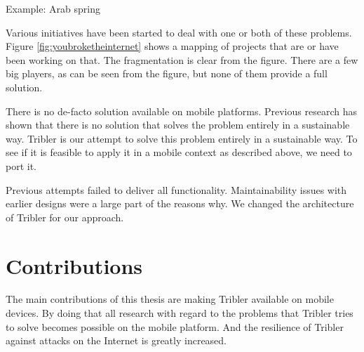 Example: Arab spring \cite{Johan_2001}


Various initiatives have been started to deal with one or both of these problems. \cite{re_decentralize}
Figure \ref{fig:youbroketheinternet} shows a mapping of projects that are or have been working on that.
The fragmentation is clear from the figure.
There are a few big players, as can be seen from the figure, but none of them provide a full solution.






There is no de-facto solution available on mobile platforms. \cite{literature_survey}
Previous research has shown that there is no solution that solves the problem entirely in a sustainable way.
Tribler is our attempt to solve this problem entirely in a sustainable way.
To see if it is feasible to apply it in a mobile context as described above, we need to port it.

Previous attempts failed to deliver all functionality. \cite{bsc_1,2,3}
Maintainability issues with earlier designs were a large part of the reasons why.
We changed the architecture of Tribler for our approach.

\section{Contributions}
The main contributions of this thesis are making Tribler available on mobile devices.
By doing that all research with regard to the problems that Tribler tries to solve becomes possible on the mobile platform.
And the resilience of Tribler against attacks on the Internet is greatly increased.

